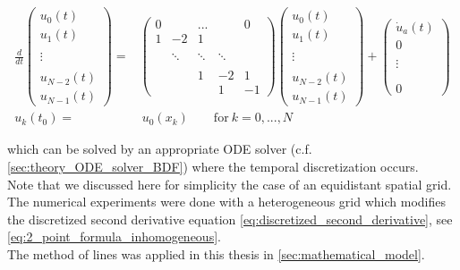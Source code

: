 \documentclass{scrartcl}[12pt, halfparskip]
\numberwithin{equation}{section}
\numberwithin{figure}{section}
\numberwithin{table}{section}
\begin{document}
\begin{align}
	\frac{d}{dt}
	\begin{pmatrix}
		u_0(t) \\
		u_1(t) \\
		\\
		\vdots \\
		\\
		u_{N-2}(t) \\
		u_{N-1}(t)
	\end{pmatrix}
	= &
	\begin{pmatrix}
		0 & & ... & & 0 \\
		1 & -2 & 1 \\
		\\
		& \ddots & \ddots & \ddots \\
		\\
		& & 1 & -2 & 1 \\
		& & & 1 & -1
	\end{pmatrix}
	\begin{pmatrix}
	u_0(t) \\
	u_1(t) \\
	\\
	\vdots \\
	\\
	u_{N-2}(t) \\
	u_{N-1}(t)
	\end{pmatrix}
	+
	\begin{pmatrix}
		\dot{u}_a(t) \\
		0 \\
		\\
		\vdots \\
		\\
		\\
		0
	\end{pmatrix} \\
	u_k(t_0) = & \ u_0(x_k) \qquad \text{for} \ k = 0,...,N \nonumber
\end{align}
 
 which can be solved by an appropriate ODE solver (c.f. \cref{sec:theory_ODE_solver_BDF}) where the temporal discretization occurs. \\
 Note that we discussed here for simplicity the case of an equidistant spatial grid. The numerical experiments were done with a heterogeneous grid which modifies the discretized second derivative equation \eqref{eq:discretized_second_derivative}, see \cref{eq:2_point_formula_inhomogeneous}. \\
 The method of lines was applied in this thesis in \cref{sec:mathematical_model}.
\end{document}
